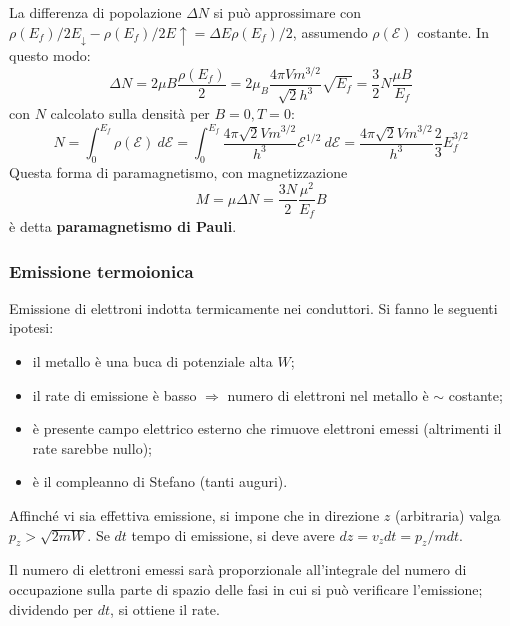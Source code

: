 \documentclass[10pt, a4paper]{scrartcl}
\numberwithin{equation}{subsection}
\theoremstyle{style1}
\begin{document}
La differenza di popolazione $\Delta N$ si pu\`o approssimare con $\rho (E_f) / 2 E_\downarrow - \rho (E_f) / 2 E\uparrow = \Delta E \rho (E_f) / 2$, assumendo $\rho (\mathscr{E})$ costante.
In questo modo:
\[
\Delta N = 2\mu B \frac{\rho (E_f) }{2} = 2\mu  _B \frac{4 \pi V m^{3 / 2} }{\sqrt{2} h^3}\sqrt{E_f} = \frac{3}{2}N \frac{\mu  B }{E_f}
\] 
con $N$ calcolato sulla densit\`a per $B=0 , T=0$:
\[
N = \int_{0} ^{E_f} \rho  (\mathscr{E}) \ d \mathscr{E} = \int_{0} ^{E_f} \frac{4\pi \sqrt{2} V m^{3 / 2} }{h^3} \mathscr{E}^{1 / 2}  \ d \mathscr{E} = \frac{4\pi \sqrt{2} V m^{3/2} }{h^3} \frac{2}{3} E_f^{ 3 / 2} 
\] 
Questa forma di paramagnetismo, con magnetizzazione
\begin{equation}
	M = \mu  \Delta N = \frac{3N}{2} \frac{\mu ^2}{E_f}B
\end{equation}
\`e detta \textbf{paramagnetismo di Pauli}.

\subsubsection{Emissione termoionica}

Emissione di elettroni indotta termicamente nei conduttori. Si fanno le seguenti ipotesi:
\begin{itemize}
	\item il metallo \`e una buca di potenziale alta $W$;
	\item il rate di emissione \`e basso $\Rightarrow $ numero di elettroni nel metallo \`e $\sim$ costante;
	\item \`e presente campo elettrico esterno che rimuove elettroni emessi (altrimenti il rate sarebbe nullo);
	\item \`e il compleanno di Stefano (tanti auguri).
\end{itemize}
Affinch\'e vi sia effettiva emissione, si impone che in direzione $z$ (arbitraria) valga $p_z > \sqrt{2m W} $. 
Se $dt$ tempo di emissione, si deve avere $dz = v_z dt = p_z / m dt$.

Il numero di elettroni emessi sar\`a proporzionale all'integrale del numero di occupazione sulla parte di spazio delle fasi in cui si pu\`o verificare l'emissione;
dividendo per $dt$, si ottiene il rate.
\end{document}

